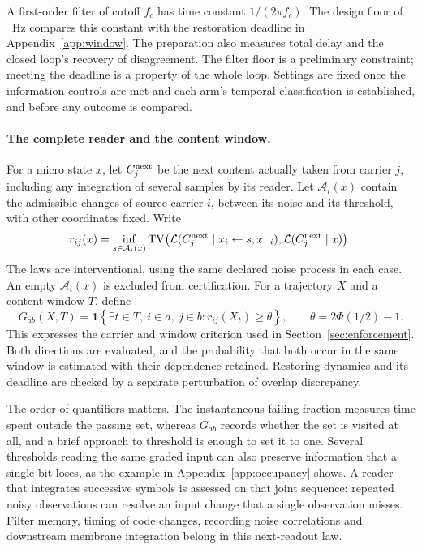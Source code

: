 \documentclass[12pt]{article}
\begin{document}
A first-order filter of cutoff $f_c$ has time constant $1/(2\pi f_c)$.
The design floor of \ueBridgeMinCutoffHz{}~Hz compares this constant with the
restoration deadline in Appendix~\ref{app:window}. The preparation also measures
total delay and the closed loop's recovery of disagreement. The filter floor
is a preliminary constraint; meeting the deadline is a property of the whole
loop. Settings are fixed once the information controls are met and each arm's
temporal classification is established, and before any outcome is compared.

\paragraph{The complete reader and the content window.}
For a micro state $x$, let $C_j^{\rm next}$ be the next content actually taken
from carrier $j$, including any integration of several samples by its reader.
Let $\mathcal A_i(x)$ contain the admissible changes of source carrier $i$,
between its noise and its threshold, with other coordinates fixed. Write
\[
 r_{ij}(x)=\inf_{s\in\mathcal A_i(x)}
 \operatorname{TV}\!\left(
   \mathcal L(C_j^{\rm next}\mid x_i\leftarrow s,x_{-i}),
   \mathcal L(C_j^{\rm next}\mid x)\right).
\]
The laws are interventional, using the same declared noise process in each
case. An empty $\mathcal A_i(x)$ is excluded from certification. For a
trajectory $X$ and a content window $T$, define
\[
 G_{ab}(X,T)=
 \mathbf 1\!\left\{\exists t\in T,\ i\in a,\ j\in b:
       r_{ij}(X_t)\geq\theta\right\},
 \qquad \theta=2\Phi(1/2)-1.
\]
This expresses the carrier and window criterion used in
Section~\ref{sec:enforcement}. Both directions are evaluated, and the
probability that both occur in the same window is estimated with their
dependence retained. Restoring dynamics and its deadline are checked by a
separate perturbation of overlap discrepancy.

The order of quantifiers matters. The instantaneous failing fraction measures
time spent outside the passing set, whereas $G_{ab}$ records whether the set is
visited at all, and a brief approach to threshold is enough to set it to one. Several thresholds
reading the same graded input can also preserve information that a single bit
loses, as the example in Appendix~\ref{app:occupancy} shows. A reader that
integrates successive symbols is assessed on that joint sequence: repeated
noisy observations can resolve an input change that a single observation
misses. Filter memory, timing of code changes, recording noise correlations
and downstream membrane integration belong in this next-readout law.
\end{document}
